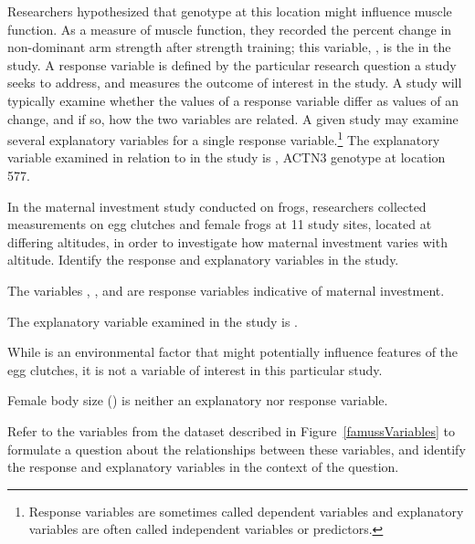 Researchers hypothesized that genotype at this location might influence muscle function. As a measure of muscle function, they recorded the percent change in non-dominant arm strength after strength training; this variable, , is the  in the study. A response variable is defined by the particular research question a study seeks to address, and measures the outcome of interest in the study. A study will typically examine whether the values of a response variable differ as values of an  change, and if so, how the two variables are related. A given study may examine several explanatory variables for a single response variable.\footnote{Response variables are sometimes called dependent variables and explanatory variables are often called independent variables or predictors.} The explanatory variable examined in relation to  in the study is , ACTN3 genotype at location 577. 

\begin{examplewrap}
\begin{nexample}{In the maternal investment study conducted on frogs, researchers collected measurements on egg clutches and female frogs at 11 study sites, located at differing altitudes, in order to investigate how maternal investment varies with altitude. Identify the response and explanatory variables in the study.}

The variables , , and  are response variables indicative of maternal investment.
	
The explanatory variable examined in the study is . 

While  is an environmental factor that might potentially influence features of the egg clutches, it is not a variable of interest in this particular study.

Female body size () is neither an explanatory nor response variable.

\label{frogVarTypesEx}
\end{nexample}
\end{examplewrap}

\begin{exercisewrap}
\begin{nexercise}
Refer to the variables from the  dataset described in Figure~\ref{famussVariables} to formulate a question about the relationships between these variables, and identify the response and explanatory variables in the context of the question.\footnotemark{}
\end{nexercise}
\end{exercisewrap}


